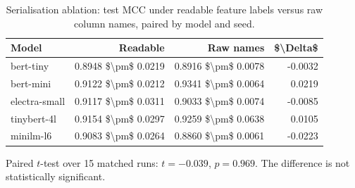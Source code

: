 \begin{table}[htbp]
\centering
\caption{Serialisation ablation: test MCC under readable feature labels versus raw column names, paired by model and seed.}
\label{tab:serialisation}
\small
\begin{tabular}{lrrr}
\toprule
Model & Readable & Raw names & \$\textbackslash Delta\$ \\
\midrule
bert-tiny & 0.8948 \$\textbackslash pm\$ 0.0219 & 0.8916 \$\textbackslash pm\$ 0.0078 & -0.0032 \\
bert-mini & 0.9122 \$\textbackslash pm\$ 0.0212 & 0.9341 \$\textbackslash pm\$ 0.0064 & 0.0219 \\
electra-small & 0.9117 \$\textbackslash pm\$ 0.0311 & 0.9033 \$\textbackslash pm\$ 0.0074 & -0.0085 \\
tinybert-4l & 0.9154 \$\textbackslash pm\$ 0.0297 & 0.9259 \$\textbackslash pm\$ 0.0638 & 0.0105 \\
minilm-l6 & 0.9083 \$\textbackslash pm\$ 0.0264 & 0.8860 \$\textbackslash pm\$ 0.0061 & -0.0223 \\
\bottomrule
\end{tabular}

\vspace{2pt}
\footnotesize Paired $t$-test over 15 matched runs: $t = -0.039$, $p = 0.969$. The difference is not statistically significant.
\end{table}
